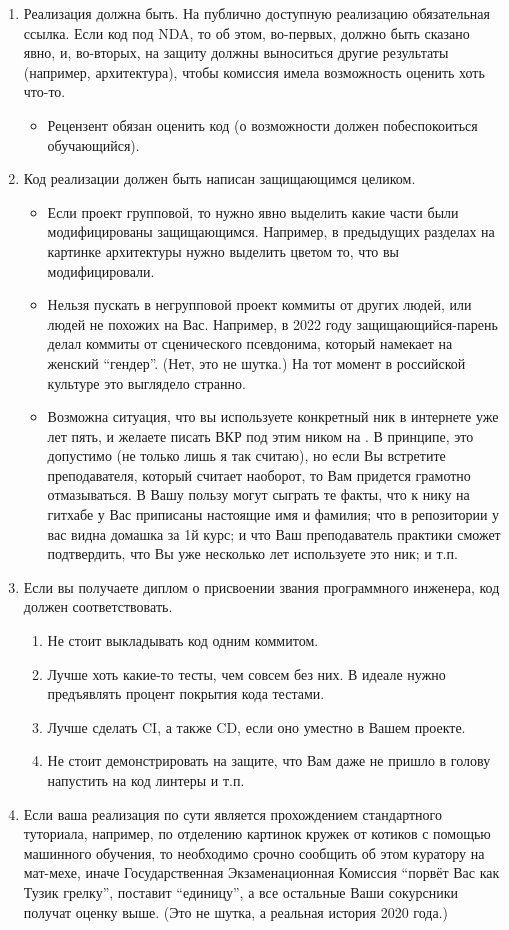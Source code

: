 \begin{enumerate}
\item Реализация должна быть. На публично доступную реализацию обязательная ссылка. Если код под \textsc{NDA}, то об этом, во-первых, должно быть сказано явно, и, во-вторых, на защиту должны выноситься другие результаты (например, архитектура), чтобы комиссия имела возможность оценить хоть что-то.
\begin{itemize}
\item  Рецензент обязан оценить код (о возможности должен побеспокоиться обучающийся).
\end{itemize}
\item Код реализации должен быть написан защищающимся целиком.
\begin{itemize}
\item  Если проект групповой, то нужно явно выделить какие части были модифицированы защищающимся. Например, в предыдущих разделах на картинке архитектуры нужно выделить цветом то, что вы модифицировали.
\item Нельзя пускать в негрупповой проект коммиты от других людей, или людей не похожих на Вас. Например, в 2022 году защищающийся-парень делал коммиты от сценического псевдонима, который намекает на женский ``гендер''. (Нет, это не шутка.) На тот момент в российской культуре это выглядело странно.
\item Возможна ситуация, что вы используете конкретный ник в интернете уже лет пять, и желаете писать ВКР под этим ником на \GitHub{}. В принципе, это допустимо (не только лишь я так считаю), но если Вы встретите преподавателя, который считает наоборот, то Вам придется грамотно отмазываться. В Вашу пользу могут сыграть те факты, что к нику на гитхабе у Вас приписаны настоящие имя и фамилия; что в репозитории у вас видна домашка за 1й курс; и что Ваш преподаватель практики сможет подтвердить, что Вы уже несколько лет используете это ник; и т.п.
\end{itemize}
\item Если вы получаете диплом о присвоении звания программного инженера, код должен соответствовать.
\begin{enumerate}
\item Не стоит выкладывать код одним коммитом.
\item Лучше хоть какие-то тесты, чем совсем без них. В идеале нужно предъявлять процент покрытия кода тестами.
\item Лучше  сделать \textsc{CI}, а также \textsc{CD}, если оно уместно в Вашем проекте.
\item Не стоит демонстрировать на защите, что Вам даже не пришло в голову напустить на код линтеры и т.п.
\end{enumerate}
\item Если ваша реализация по сути является прохождением стандартного туториала, например, по отделению картинок кружек от котиков с помощью машинного обучения, то необходимо срочно сообщить об этом куратору на мат-мехе, иначе Государственная Экзаменационная Комиссия ``порвёт Вас как Тузик грелку'', поставит ``единицу'', а все остальные Ваши сокурсники получат оценку выше. (Это не шутка, а реальная история 2020 года.)
\end{enumerate}

